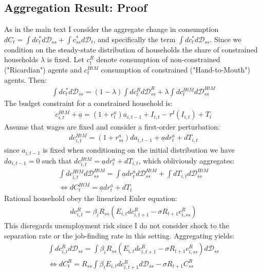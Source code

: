 \subsection{Aggregation Result: Proof} \label{Agg_result_proof}
As in the main text I consider the aggregate change in consumption $dC_{t}=\int dc_{t}^{*}d\mathcal{D}_{ss}+\int c_{ss}^{*}d\mathcal{D}_{t}$, and specifically the term $\int dc_{t}^{*}d\mathcal{D}_{ss}$. Since we condition on the steady-state distribution of households the share of constrained households $\lambda$ is fixed. Let $c_{t}^{R}$ denote consumption of non-constrained ("Ricardian") agents and $c_{t}^{HtM}$ consumption of constrained ("Hand-to-Mouth") agents. Then:
\begin{gather*}
\int dc_{t}^{*}d\mathcal{D}_{ss}=\left(1-\lambda\right)\int dc_{t}^{R}d\mathcal{D}_{ss}^{R}+\lambda\int dc_{t}^{HtM}d\mathcal{D}_{ss}^{HtM}
\end{gather*}
The budget constraint for a constrained household is:
\begin{gather*}
c_{i,t}^{HtM}+\underline{a}=(1+r_{t}^{a})a_{i,t-1}+I_{i,t}-\tau^{I}\left(I_{i,t}\right)+T_{t}
\end{gather*}
Assume that wages are fixed and consider a first-order perturbation:
\begin{gather*}
dc_{i,t}^{HtM}=(1+r_{ss}^{a})da_{i,t-1}+\underline{a}dr_{t}^{a}+dT_{i,t}
\end{gather*}
since $a_{i,t-1}$ is fixed when conditioning on the initial distribution we have $da_{i,t-1}=0$ such that $dc_{i,t}^{HtM}=\underline{a}dr_{t}^{a}+dT_{i,t}$, which obliviously aggregates:
\begin{gather*}
\int dc_{i,t}^{HtM}d\mathcal{D}_{ss}^{HtM}=\int\underline{a}dr_{t}^{a}d\mathcal{D}_{ss}^{HtM}+\int dT_{i,t}d\mathcal{D}_{ss}^{HtM} \\
\Leftrightarrow dC_{t}^{HtM}=\underline{a}dr_{t}^{a}+dT_{t}
\end{gather*}
Rational household obey the linearized Euler equation:
\begin{gather*}
dc_{i,t}^{R}=\beta_{i}R_{ss}\left(E_{i,t}dc_{i,t+1}^{R}-\sigma R_{t+1}c_{i,ss}^{R}\right)
\end{gather*}
This disregards unemployment risk since I do not consider shock to the separation rate or the job-finding rate in this setting. Aggregating yields:
\begin{gather*}
\int dc_{i,t}^{R}d\mathcal{D}_{ss}=\int\beta_{i}R_{ss}\left(E_{i,t}dc_{i,t+1}^{R}-\sigma R_{t+1}c_{i,ss}^{R}\right)d\mathcal{D}_{ss} \\
\Leftrightarrow dC_{t}^{R}=R_{ss}\int\beta_{i}E_{i,t}dc_{i,t+1}^{R}d\mathcal{D}_{ss}-\sigma R_{t+1}C_{ss}^{R}
\end{gather*}


